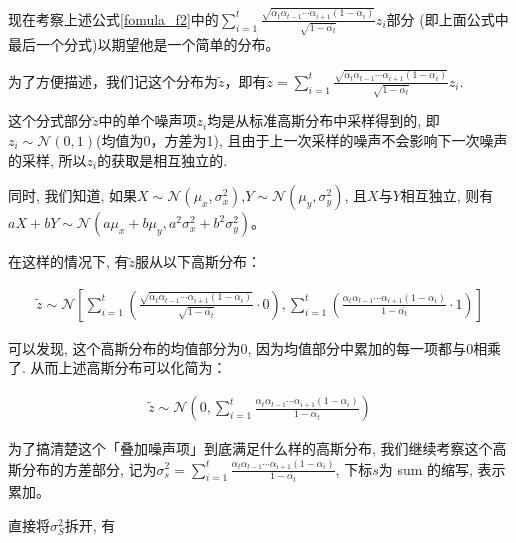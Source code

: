 现在考察上述公式\ref{fomula_f2}中的$\sum_{i=1}^t\frac{\sqrt{\alpha_t\alpha_{t-1}\cdots\alpha_{i+1}(1-\alpha_i)}}{\sqrt{1-\overline{\alpha_t}}}z_i$部分 (即上面公式中最后一个分式)以期望他是一个简单的分布。

为了方便描述，我们记这个分布为$\widetilde{z}$，即有$\widetilde{z}=\sum_{i=1}^t\frac{\sqrt{\alpha_t\alpha_{t-1}\cdots\alpha_{i+1}(1-\alpha_i)}}{\sqrt{1-\overline{\alpha_t}}}z_i$.

这个分式部分$\widetilde{z}$中的单个噪声项$z_i$均是从标准高斯分布中采样得到的, 即$z_i\sim\mathcal{N}(0,1)$(均值为0，方差为1), 且由于上一次采样的噪声不会影响下一次噪声的采样, 所以$z_i$的获取是相互独立的.

同时, 我们知道, 如果$X\sim \mathcal{N}(\mu_x,\sigma_x^2)$,$Y\sim \mathcal{N}(\mu_y,\sigma_y^2)$, 且$X$与$Y$相互独立, 则有$aX+bY\sim\mathcal{N}(a\mu_x+b\mu_y,a^2\sigma_x^2+b^2\sigma_y^2)$。

在这样的情况下, 有$\widetilde{z}$服从以下高斯分布：

\begin{equation}
    \begin{aligned}
        \widetilde{z} \sim \mathcal{N}\left[\sum_{i=1}^t\left(\frac{\sqrt{\alpha_t\alpha_{t-1}\cdots\alpha_{i+1}(1-\alpha_i)}}{\sqrt{1-\overline{\alpha_t}}}\cdot0\right), \sum_{i=1}^t\left(\frac{\alpha_t\alpha_{t-1}\cdots\alpha_{i+1}(1-\alpha_i)}{1-\overline{\alpha_t}}\cdot 1\right)\right]
    \end{aligned}
\end{equation}

可以发现, 这个高斯分布的均值部分为$0$, 因为均值部分中累加的每一项都与$0$相乘了. 从而上述高斯分布可以化简为：

\begin{equation}
    \begin{aligned}
        \widetilde{z}\sim \mathcal{N}\left(0, \sum_{i=1}^t\frac{\alpha_t\alpha_{t-1}\cdots\alpha_{i+1}(1-\alpha_i)}{1-\overline{\alpha_t}} \right)
    \end{aligned}
\end{equation}

为了搞清楚这个「叠加噪声项」到底满足什么样的高斯分布, 我们继续考察这个高斯分布的方差部分, 记为$\sigma^2_s=\sum_{i=1}^t\frac{\alpha_t\alpha_{t-1}\cdots\alpha_{i+1}(1-\alpha_i)}{1-\overline{\alpha_t}}$, 下标$s$为 sum 的缩写, 表示累加。

直接将$\sigma^2_S$拆开, 有

